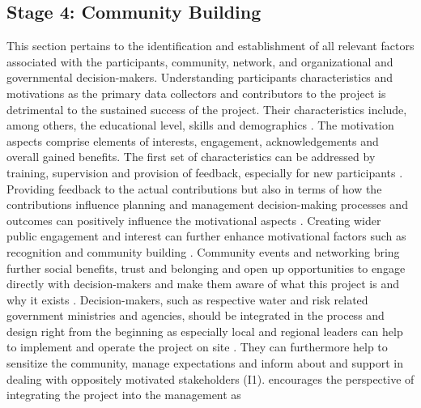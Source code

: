 \subsection{Stage 4: Community Building}
This section pertains to the identification and establishment of all relevant factors associated with the participants, community, network, and organizational and governmental decision-makers. Understanding participants characteristics and motivations as the primary data collectors and contributors to the project is detrimental to the sustained success of the project. Their characteristics include, among others, the educational level, skills and demographics \autocite{cervoniImplementingIntegratedWater2008,fraislCitizenScienceEnvironmental2022}. The motivation aspects comprise elements of interests, engagement, acknowledgements and overall gained benefits. The first set of characteristics can be addressed by training, supervision and provision of feedback, especially for new participants \autocite{escaeuropeancitizenscienceassociationTenPrinciplesCitizen2015,fraislCitizenScienceEnvironmental2022,minkmanCitizenScienceWater2015,sharpeCommunityBasedEcological2006}. Providing feedback to the actual contributions but also in terms of how the contributions influence planning and management decision-making processes and outcomes can positively influence the motivational aspects \autocite{conradMeaningfulCommunityBasedEcological2006,conradReviewCitizenScience2011,whitelawEstablishingCanadianCommunity2003}. Creating wider public engagement and interest can further enhance motivational factors such as recognition and community building \autocite{conradMeaningfulCommunityBasedEcological2006}. Community events and networking bring further social benefits, trust and belonging and open up opportunities to engage directly with decision-makers and make them aware of what this project is and why it exists \autocite{conradMeaningfulCommunityBasedEcological2006,fraislCitizenScienceEnvironmental2022,sharpeCommunityBasedEcological2006}. Decision-makers, such as respective water and risk related government ministries and agencies, should be integrated in the process and design right from the beginning as especially local and regional leaders can help to implement and operate the project on site \autocite{gualazziniEWEAEarlyWarning2021,ifrcCommunityBasedSurveillanceGuiding2017}. They can furthermore help to sensitize the community, manage expectations and inform about and support in dealing with oppositely motivated stakeholders (I1). \autocite{conradMeaningfulCommunityBasedEcological2006} encourages the perspective of integrating the project into the management as 